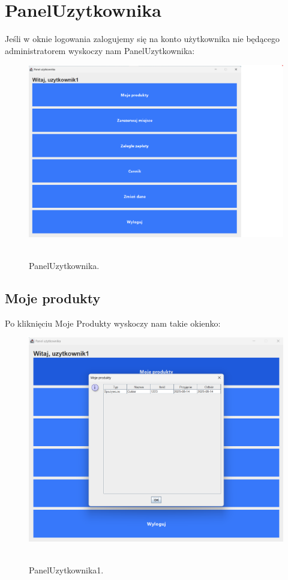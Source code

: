 \section{PanelUzytkownika}
\label{sec:PanelUzytkownika}
Jeśli w oknie logowania zalogujemy się na konto użytkownika nie będącego administratorem wyskoczy nam PanelUzytkownika:
\begin{figure}[H]
    \centering
    \includegraphics[width=.7\linewidth]{figures/PanelUzytkownika.png}\
    \caption{PanelUzytkownika.\label{PanelUzytkownika}}
\end{figure}
\clearpage
\subsection{Moje produkty}
\label{subsec:Moje produkty}
Po kliknięciu Moje Produkty wyskoczy nam takie okienko:
\begin{figure}[H]
    \centering
    \includegraphics[width=.7\linewidth]{figures/PanelUzytkownika1.png}\
    \caption{PanelUzytkownika1.\label{PanelUzytkownika1}}
\end{figure}
\clearpage
